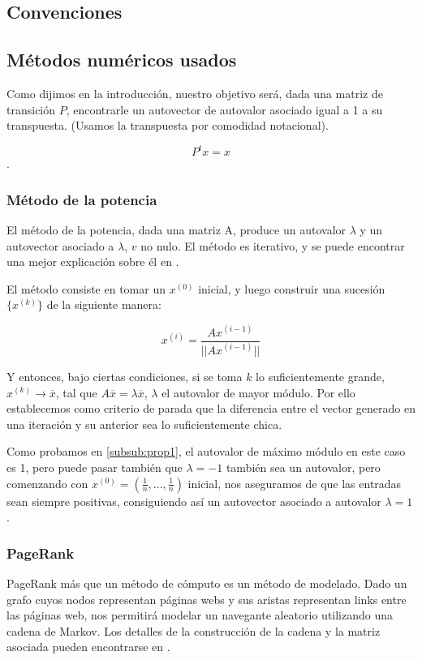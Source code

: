 \subsection{Convenciones}

\subsection{Métodos numéricos usados}

Como dijimos en la introducción, nuestro objetivo será, dada una matriz de transición $P$, encontrarle un autovector de autovalor asociado igual a 1 a su transpuesta. (Usamos la transpuesta por comodidad notacional).

\[P^t x = x\].


\subsubsection{Método de la potencia}
El método de la potencia, dada una matriz A, produce un autovalor $\lambda$ y un autovector asociado a $\lambda$, $v$ no nulo. El método es iterativo, y se puede encontrar una mejor explicación sobre él en \cite[Cap. 5.8.1]{dahlquist}. 

El método consiste en tomar un $x^{(0)}$ inicial, y luego construir una sucesión $\{x^{(k)}\}$ de la siguiente manera:

\[x^{(i)} = \frac{A x^{(i-1)}}{||A x^{(i-1)}||}\]

Y entonces, bajo ciertas condiciones, si se toma $k$ lo suficientemente grande, $x^{(k)} \to \overline{x}$, tal que $A\overline{x} = \lambda \overline{x}$, $\lambda$ el autovalor de mayor módulo. Por ello establecemos como criterio de parada que la diferencia entre el vector generado en una iteración y su anterior sea lo suficientemente chica.

Como probamos en \ref{subsub:prop1}, el autovalor de máximo módulo en este caso es 1, pero puede pasar también que $\lambda = -1$ también sea un autovalor, pero comenzando con $x^{(0)} = (\frac1n,..., \frac1n)$ inicial, nos aseguramos de que las entradas sean siempre positivas, consiguiendo así un autovector asociado a autovalor $\lambda = 1$.

\subsubsection{PageRank}
PageRank más que un m\'etodo de cómputo es un m\'etodo de modelado. Dado un grafo cuyos nodos representan páginas webs y sus aristas representan links entre las páginas web, nos permitirá modelar un navegante aleatorio utilizando una cadena de Markov. 
Los detalles de la construcción de la cadena y la matriz asociada pueden encontrarse en \cite{Brin1998}.

